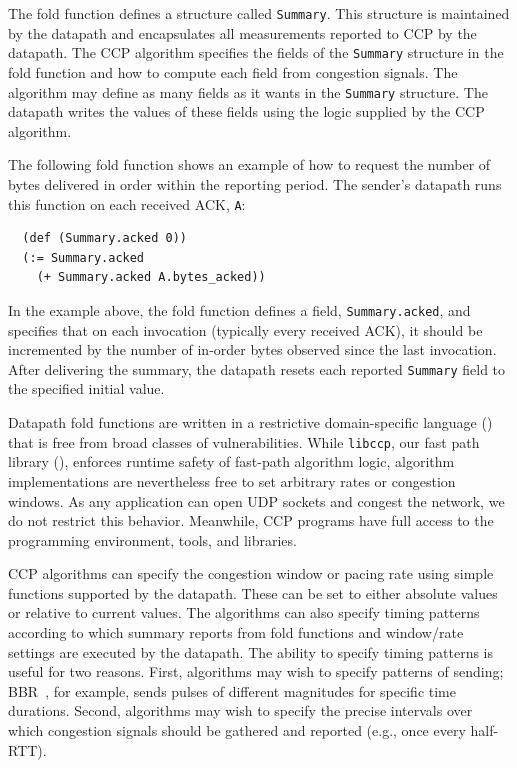 The fold function defines a structure called \texttt{Summary}. This structure is maintained by the datapath and encapsulates all measurements reported to CCP by the datapath. The CCP algorithm specifies the fields of the \texttt{Summary} structure in the fold function and how to compute each field from congestion signals. The algorithm may define as many fields as it wants in the \texttt{Summary} structure. The datapath writes the values of these fields using the logic supplied by the CCP algorithm.
 
The following fold function shows an example of how to request the number of bytes delivered in order within the reporting period. The sender's datapath runs this function on each received ACK, \texttt{A}:
 
\begin{verbatim}
  (def (Summary.acked 0))
  (:= Summary.acked
    (+ Summary.acked A.bytes_acked))
\end{verbatim}
 
 
In the example above, the fold function defines a field, \texttt{Summary.acked}, and specifies that on each invocation (typically every received ACK), it should be incremented by the number of in-order bytes observed since the last invocation. After delivering the summary, the datapath resets each reported \texttt{Summary} field to the specified initial value.

Datapath fold functions are written in a restrictive domain-specific language ()
that is free from broad classes of vulnerabilities. While \texttt{libccp}, our fast path library (), enforces runtime safety of fast-path algorithm logic,
algorithm implementations are nevertheless free to set arbitrary rates or congestion windows.
As any application can open UDP sockets and congest the network, we do not restrict this behavior.
Meanwhile, CCP \userspace programs have full access to the \userspace programming environment,
tools, and libraries.

 
 CCP algorithms can specify the congestion window or pacing rate using simple functions supported by the datapath. These can be set to either absolute values or relative to current values. The algorithms can also specify timing patterns according to which summary reports from fold functions and window/rate settings are executed by the datapath. 
The ability to specify timing patterns is useful for two reasons. First, algorithms may wish to specify patterns of sending; BBR~\cite{bbr}, for example, sends pulses of different magnitudes for specific time durations. Second, algorithms may wish to specify the precise intervals over which congestion signals should be gathered and reported (e.g., once every half-RTT).
 
